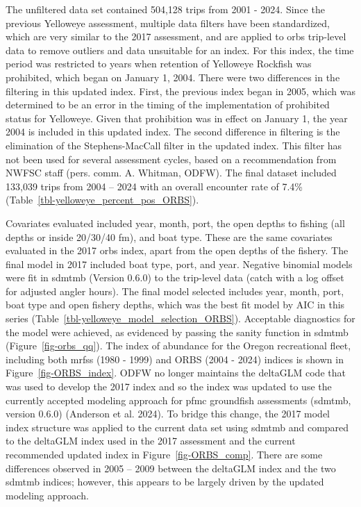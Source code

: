 \documentclass[
  english,
]{article}
\begin{document}
The unfiltered data set contained 504,128 trips from 2001 - 2024. Since
the previous Yelloweye assessment, multiple data filters have been
standardized, which are very similar to the 2017 assessment, and are
applied to \gls{orbs} trip-level data to remove outliers and data
unsuitable for an index. For this index, the time period was restricted
to years when retention of Yelloweye Rockfish was prohibited, which
began on January 1, 2004. There were two differences in the filtering in
this updated index. First, the previous index began in 2005, which was
determined to be an error in the timing of the implementation of
prohibited status for Yelloweye. Given that prohibition was in effect on
January 1, the year 2004 is included in this updated index. The second
difference in filtering is the elimination of the Stephens-MacCall
filter in the updated index. This filter has not been used for several
assessment cycles, based on a recommendation from NWFSC staff (pers.
comm. A. Whitman, ODFW). The final dataset included 133,039 trips from
2004 -- 2024 with an overall encounter rate of 7.4\%
(Table~\ref{tbl-yelloweye_percent_pos_ORBS}).

Covariates evaluated included year, month, port, the open depths to
fishing (all depths or inside 20/30/40 fm), and boat type. These are the
same covariates evaluated in the 2017 \gls{orbs} index, apart from the
open depths of the fishery. The final model in 2017 included boat type,
port, and year. Negative binomial models were fit in \gls{sdmtmb}
(Version 0.6.0) to the trip-level data (catch with a log offset for
adjusted angler hours). The final model selected includes year, month,
port, boat type and open fishery depths, which was the best fit model by
AIC in this series (Table~\ref{tbl-yelloweye_model_selection_ORBS}).
Acceptable diagnostics for the model were achieved, as evidenced by
passing the sanity function in \gls{sdmtmb} (Figure~\ref{fig-orbs_qq}).
The index of abundance for the Oregon recreational fleet, including both
\gls{mrfss} (1980 - 1999) and ORBS (2004 - 2024) indices is shown in
Figure~\ref{fig-ORBS_index}. ODFW no longer maintains the deltaGLM code
that was used to develop the 2017 index and so the index was updated to
use the currently accepted modeling approach for \gls{pfmc} groundfish
assessments (\gls{sdmtmb}, version 0.6.0) (Anderson et al. 2024). To
bridge this change, the 2017 model index structure was applied to the
current data set using \gls{sdmtmb} and compared to the deltaGLM index
used in the 2017 assessment and the current recommended updated index in
Figure~\ref{fig-ORBS_comp}. There are some differences observed in 2005
-- 2009 between the deltaGLM index and the two \gls{sdmtmb} indices;
however, this appears to be largely driven by the updated modeling
approach.
\end{document}

